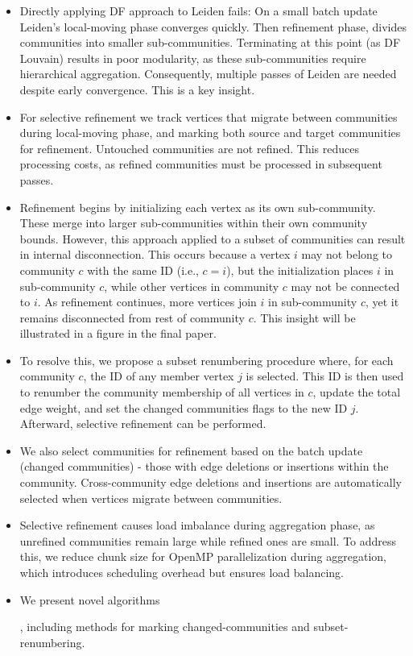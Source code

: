 \begin{itemize}
  \item Directly applying DF approach \cite{sahu2024shared} to Leiden fails: On a small batch update Leiden's local-moving phase converges quickly. Then refinement phase, divides communities into smaller sub-communities. Terminating at this point (as DF Louvain) results in poor modularity, as these sub-communities require hierarchical aggregation. Consequently, multiple passes of Leiden are needed despite early convergence. This is a key insight.
  \item For selective refinement we track vertices that migrate between communities during local-moving phase, and marking both source and target communities for refinement. Untouched communities are not refined. This reduces processing costs, as refined communities must be processed in subsequent passes.
  \item Refinement begins by initializing each vertex as its own sub-community. These merge into larger sub-communities within their own community bounds. However, this approach applied to a subset of communities can result in internal disconnection. This occurs because a vertex $i$ may not belong to community $c$ with the same ID (i.e., $c = i$), but the initialization places $i$ in sub-community $c$, while other vertices in community $c$ may not be connected to $i$. As refinement continues, more vertices join $i$ in sub-community $c$, yet it remains disconnected from rest of community $c$. This insight will be illustrated in a figure in the final paper.
  \item To resolve this, we propose a subset renumbering procedure where, for each community $c$, the ID of any member vertex $j$ is selected. This ID is then used to renumber the community membership of all vertices in $c$, update the total edge weight, and set the changed communities flags to the new ID $j$. Afterward, selective refinement can be performed.
  \item We also select communities for refinement based on the batch update (changed communities) - those with edge deletions or insertions within the community. Cross-community edge deletions and insertions are automatically selected when vertices migrate between communities.
  \item Selective refinement causes load imbalance during aggregation phase, as unrefined communities remain large while refined ones are small. To address this, we reduce chunk size for OpenMP parallelization during aggregation, which introduces scheduling overhead but ensures load balancing.
  \item We present novel algorithms, including methods for marking changed-communities and subset-renumbering.
\end{itemize}

